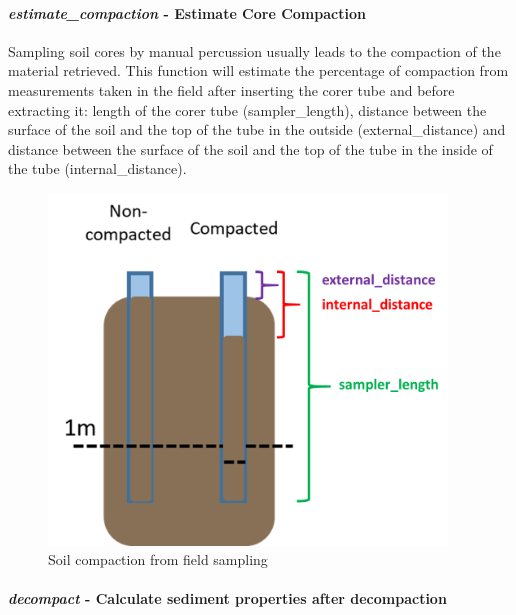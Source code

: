 \documentclass[10pt,a4paper,onecolumn]{article}
\let\oldparagraph\paragraph
\renewcommand{\paragraph}[1]{\oldparagraph{#1}\mbox{}}
\begin{document}
\hypertarget{estimate_compaction---estimate-core-compaction}{%
\paragraph{\texorpdfstring{\textbf{\emph{estimate\_compaction}}
\textbf{- Estimate Core
Compaction}}{estimate\_compaction - Estimate Core Compaction}}\label{estimate_compaction---estimate-core-compaction}}

Sampling soil cores by manual percussion usually leads to the compaction
of the material retrieved. This function will estimate the percentage of
compaction from measurements taken in the field after inserting the
corer tube and before extracting it: length of the corer tube
(sampler\_length), distance between the surface of the soil and the top
of the tube in the outside (external\_distance) and distance between the
surface of the soil and the top of the tube in the inside of the tube
(internal\_distance).

\begin{figure}
\centering
\includegraphics[width=4.16667in,height=\textheight]{images/compaction-01.png}
\caption{Soil compaction from field sampling}
\end{figure}

\hypertarget{decompact---calculate-sediment-properties-after-decompaction}{%
\paragraph{\texorpdfstring{\textbf{\emph{decompact}} \textbf{- Calculate
sediment properties after
decompaction}}{decompact - Calculate sediment properties after decompaction}}\label{decompact---calculate-sediment-properties-after-decompaction}}
\end{document}

